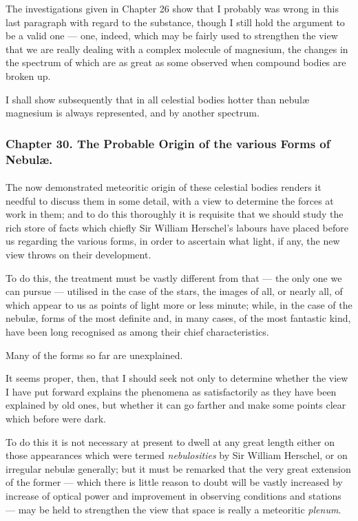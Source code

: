 \documentclass[a4paper, 12pt, oneside, polutonikogreek, english]{article}
\begin{document}
The investigations given in Chapter 26 show that I probably was wrong in this last paragraph with regard to the substance, though I still hold the argument to be a valid one --- one, indeed, which may be fairly used to strengthen the view that we are really dealing with a complex molecule of magnesium, the changes in the spectrum of which are as great as some observed when compound bodies are broken up.

I shall show subsequently that in all celestial bodies hotter than nebulæ magnesium is always represented, and by another spectrum.
\clearpage
\subsubsection{Chapter 30. The Probable Origin of the various Forms of Nebulæ.}
\paragraph{}
The now demonstrated meteoritic origin of these celestial bodies renders it needful to discuss them in some detail, with a view to determine the forces at work in them; and to do this thoroughly it is requisite that we should study the rich store of facts which chiefly Sir William Herschel's labours have placed before us regarding the various forms, in order to ascertain what light, if any, the new view throws on their development.

To do this, the treatment must be vastly different from that --- the only one we can pursue --- utilised in the case of the stars, the images of all, or nearly all, of which appear to us as points of light more or less minute; while, in the case of the nebulæ, forms of the most definite and, in many cases, of the most fantastic kind, have been long recognised as among their chief characteristics.

Many of the forms so far are unexplained.

It seems proper, then, that I should seek not only to determine whether the view I have put forward explains the phenomena as satisfactorily as they have been explained by old ones, but whether it can go farther and make some points clear which before were dark.

To do this it is not necessary at present to dwell at any great length either on those appearances which were termed \emph{nebulosities} by Sir William Herschel, or on irregular nebulæ generally; but it must be remarked that the very great extension of the former --- which there is little reason to doubt will be vastly increased by increase of optical power and improvement in observing conditions and stations --- may be held to strengthen the view that space is really a meteoritic \emph{plenum}.
\end{document}
